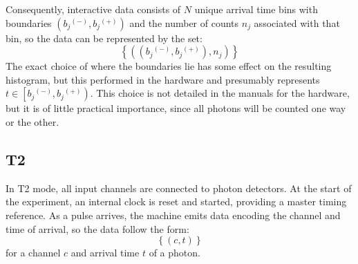 \documentclass{book}
\newcommand{\braces}[1]{\ensuremath{\left\lbrace #1 \right\rbrace}}
\newcommand{\angles}[1]{\ensuremath{\left\langle #1 \right\rangle}}
\newcommand{\parens}[1]{\ensuremath{\left( #1 \right)}}
\newcommand{\gn}[1]{\ensuremath{g^{(#1)}}}
\newcommand{\channel}{\ensuremath{c}}
\newcommand{\upplus}{\ensuremath{^{(+)}}}
\newcommand{\upminus}{\ensuremath{^{(-)}}}
\newcommand{\closedopenrange}[2]{\ensuremath{\left[#1, #2\right)}}
\renewcommand{\time}{\ensuremath{t}}
\newcommand{\bin}{\ensuremath{b}}
\newcommand{\counts}{\ensuremath{n}}
\numberwithin{equation}{section}
\numberwithin{figure}{section}
\begin{document}
Consequently, interactive data consists of $N$ unique arrival time bins with boundaries $\parens{\bin_{j}\upminus, \bin_{j}\upplus}$ and the number of counts $\counts_{j}$ associated with that bin, so the data can be represented by the set:
\begin{equation}
\braces{
    \parens{
          \parens{\bin_{j}\upminus, 
                  \bin_{j}\upplus},
          \counts_{j}}}
\end{equation}
The exact choice of where the boundaries lie has some effect on the resulting histogram, but this performed in the hardware and presumably represents $\time\in\closedopenrange{\bin_{j}\upminus}{\bin_{j}\upplus}$. This choice is not detailed in the manuals for the hardware, but it is of little practical importance, since all photons will be counted one way or the other.

\subsection{T2}
In T2 mode, all input channels are connected to photon detectors. At the start of the experiment, an internal clock is reset and started, providing a master timing reference. As a pulse arrives, the machine emits data encoding the channel and time of arrival, so the data follow the form:
\begin{equation}
\braces{\parens{\channel, \time}}
\end{equation}
for a channel \channel{} and arrival time \time{} of a photon.
\end{document}
